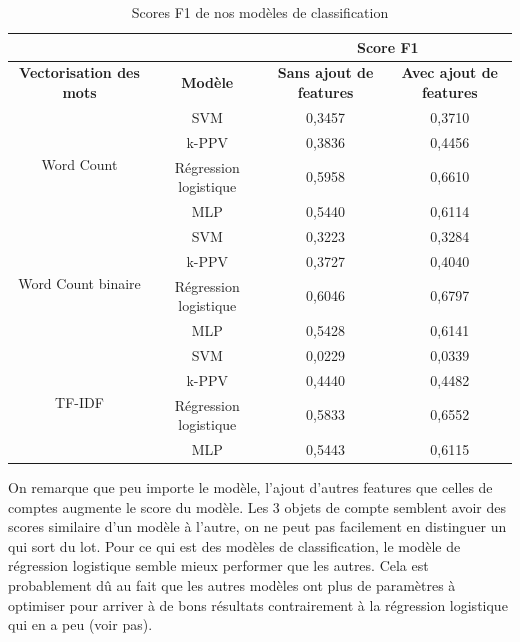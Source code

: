 \begin{longtable}[c]{cccc}
	\caption{Scores F1 de nos modèles de classification}
	\label{table:modeles_classification}\\
	\hline
	&                       & \multicolumn{2}{c}{\textbf{Score F1}}                             \\ 
	\endhead
	\cline{2-4}
	\endfoot
	\endlastfoot
	\textbf{Vectorisation des mots}     & \textbf{Modèle}       & \textbf{Sans ajout de features} & \textbf{Avec ajout de features} \\ \hline
	\multirow{4}{*}{Word Count}         & SVM & 0,3457 & 0,3710 \\ 
	& k-PPV                 & 0,3836 & 0,4456 \\
	& Régression logistique & 0,5958 & 0,6610 \\
	& MLP                   & 0,5440 & 0,6114 \\ \hline
	\multirow{4}{*}{Word Count binaire} & SVM & 0,3223 & 0,3284 \\ 
	& k-PPV                 & 0,3727 & 0,4040 \\
	& Régression logistique & 0,6046 & 0,6797 \\
	& MLP                   & 0,5428 & 0,6141 \\ \hline
	\multirow{4}{*}{TF-IDF}             & SVM & 0,0229 & 0,0339 \\
	& k-PPV                 & 0,4440 & 0,4482 \\
	& Régression logistique & 0,5833 & 0,6552 \\
	& MLP                   & 0,5443 & 0,6115 \\ \hline
\end{longtable}

On remarque que peu importe le modèle, l'ajout d'autres features que celles de comptes augmente le score du modèle. Les 3 objets de compte semblent avoir des scores similaire d'un modèle à l'autre, on ne peut pas facilement en distinguer un qui sort du lot. Pour ce qui est des modèles de classification, le modèle de régression logistique semble mieux performer que les autres. Cela est probablement dû au fait que les autres modèles ont plus de paramètres à optimiser pour arriver à de bons résultats contrairement à la régression logistique qui en a peu (voir pas).
